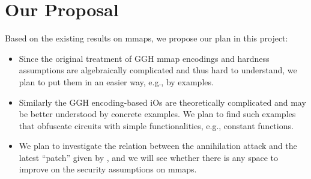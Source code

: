 \documentclass[10pt]{article}
\theoremstyle{plain}
\theoremstyle{definition}
\theoremstyle{remark}
\begin{document}
\section{Our Proposal}
Based on the existing results on mmaps, we propose our plan in this project:
\begin{itemize}
\item Since the original treatment of GGH mmap encodings and hardness assumptions are algebraically complicated and thus hard to understand, we plan to put them in an easier way, e.g., by examples.
\item Similarly the GGH encoding-based iOs are theoretically complicated and may be better understood by concrete examples. We plan to find such examples that obfuscate circuits with simple functionalities, e.g., constant functions.
\item We plan to investigate the relation between the annihilation attack and the latest ``patch'' given by \cite{GMS16}, and we will see whether there is any space to improve on the security assumptions on mmaps.
\end{itemize}



\end{document}
